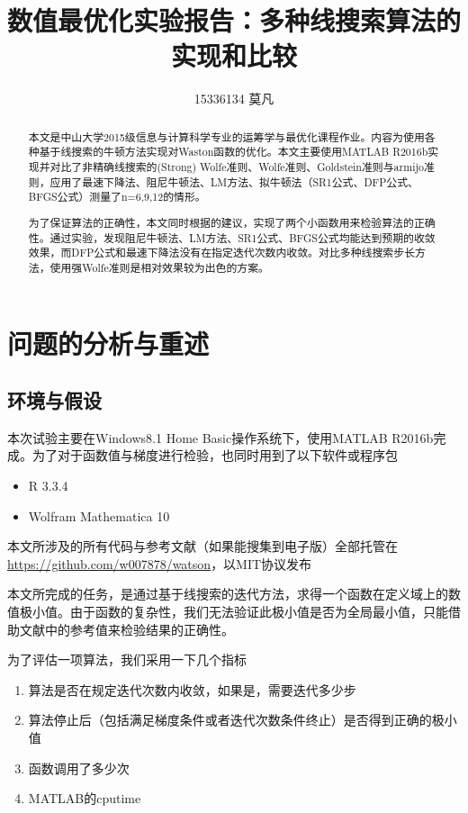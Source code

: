 \documentclass[11pt, a4paper]{article}
\begin{document}
\title{数值最优化实验报告：多种线搜索算法的实现和比较}
\author{15336134 莫凡}
\maketitle
\vspace{50pt}
\begin{abstract}
	本文是中山大学2015级信息与计算科学专业的运筹学与最优化课程作业\cite{高立2014数}。内容为使用各种基于线搜索的牛顿方法实现对Waston函数\cite{More:1981:TUO:355934.355936}的优化。本文主要使用MATLAB R2016b实现并对比了非精确线搜索的(Strong) Wolfe准则、Wolfe准则、Goldstein准则与armijo准则，应用了最速下降法、阻尼牛顿法、LM方法、拟牛顿法（SR1公式、DFP公式、BFGS公式）测量了n=6,9,12的情形。
	
	为了保证算法的正确性，本文同时根据\cite{More:1981:TUO:355934.355936}的建议，实现了两个小函数用来检验算法的正确性。通过实验，发现阻尼牛顿法、LM方法、SR1公式、BFGS公式均能达到预期的收敛效果，而DFP公式和最速下降法没有在指定迭代次数内收敛。对比多种线搜索步长方法，使用强Wolfe准则是相对效果较为出色的方案。
\end{abstract}
\newpage
\tableofcontents
\newpage

\section{问题的分析与重述}

\subsection{环境与假设}
本次试验主要在Windows8.1 Home Basic操作系统下，使用MATLAB R2016b完成。为了对于函数值与梯度进行检验，也同时用到了以下软件或程序包
\begin{itemize}
	\item R 3.3.4
	\item Wolfram Mathematica 10
\end{itemize}

本文所涉及的所有代码与参考文献（如果能搜集到电子版）全部托管在 \url{https://github.com/w007878/watson}，以MIT协议发布

本文所完成的任务，是通过基于线搜索的迭代方法，求得一个函数在定义域上的数值极小值。由于函数的复杂性，我们无法验证此极小值是否为全局最小值，只能借助文献\cite{More:1981:TUO:355934.355936}中的参考值来检验结果的正确性。

为了评估一项算法，我们采用一下几个指标
\begin{enumerate}
	\item 算法是否在规定迭代次数内收敛，如果是，需要迭代多少步
	\item 算法停止后（包括满足梯度条件或者迭代次数条件终止）是否得到正确的极小值
	\item 函数调用了多少次
	\item MATLAB的cputime
\end{enumerate}
\end{document}

